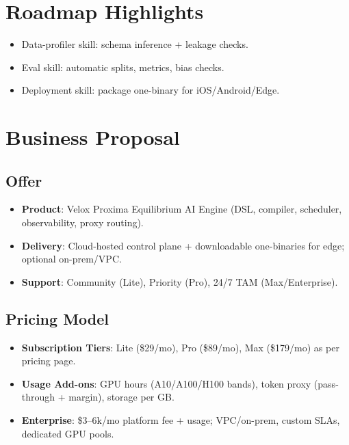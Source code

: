 \documentclass[11pt]{article}
\begin{document}
\section{Roadmap Highlights}
\begin{itemize}
  \item Data-profiler skill: schema inference + leakage checks.
  \item Eval skill: automatic splits, metrics, bias checks.
  \item Deployment skill: package one-binary for iOS/Android/Edge.
\end{itemize}

\section{Business Proposal}
\subsection{Offer}
\begin{itemize}
  \item \textbf{Product}: Velox Proxima Equilibrium AI Engine (DSL, compiler, scheduler, observability, proxy routing).
  \item \textbf{Delivery}: Cloud-hosted control plane + downloadable one-binaries for edge; optional on-prem/VPC.
  \item \textbf{Support}: Community (Lite), Priority (Pro), 24/7 TAM (Max/Enterprise).
\end{itemize}

\subsection{Pricing Model}
\begin{itemize}
  \item \textbf{Subscription Tiers}: Lite (\$29/mo), Pro (\$89/mo), Max (\$179/mo) as per pricing page.
  \item \textbf{Usage Add-ons}: GPU hours (A10/A100/H100 bands), token proxy (pass-through + margin), storage per GB.
  \item \textbf{Enterprise}: \$3--6k/mo platform fee + usage; VPC/on-prem, custom SLAs, dedicated GPU pools.
\end{itemize}
\end{document}
